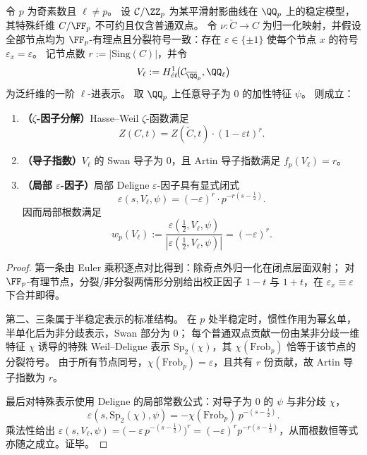 \begin{theorem}\label{thm:xi-semistable-nodal-fiber-local-epsilon-factor}
令 \(p\) 为奇素数且 \(\ell\neq p\)。
设 \(\mathcal C/\ZZ_p\) 为某平滑射影曲线在 \(\QQ_p\) 上的稳定模型，其特殊纤维 \(C/\FF_p\) 不可约且仅含普通双点。
令 \(\nu:\widetilde C\to C\) 为归一化映射，并假设全部节点均为 \(\FF_p\)-有理点且分裂符号一致：存在 \(\varepsilon\in\{\pm 1\}\) 使每个节点 \(x\) 的符号 \(\varepsilon_x=\varepsilon\)。
记节点数 \(r:=|\mathrm{Sing}(C)|\)，并令
\[
V_\ell:=H^1_{\acute e t}\!\bigl(\mathcal C_{\overline{\QQ}_p},\QQ_\ell\bigr)
\]
为泛纤维的一阶 \(\ell\)-进表示。
取 \(\QQ_p\) 上任意导子为 \(0\) 的加性特征 \(\psi\)。
则成立：
\begin{enumerate}
  \item \textbf{（\texorpdfstring{$\zeta$}{zeta}-因子分解）}Hasse--Weil \(\zeta\)-函数满足
  \[
  Z(C,t)=Z(\widetilde C,t)\cdot(1-\varepsilon t)^{r}.
  \]
  \item \textbf{（导子指数）}\(V_\ell\) 的 Swan 导子为 \(0\)，且 Artin 导子指数满足 \(f_p(V_\ell)=r\)。
  \item \textbf{（局部 \texorpdfstring{$\varepsilon$}{epsilon}-因子）}局部 Deligne \(\varepsilon\)-因子具有显式闭式
  \[
  \varepsilon\!\left(s,V_\ell,\psi\right)=(-\varepsilon)^{r}\cdot p^{-r\left(s-\tfrac12\right)}.
  \]
  因而局部根数满足
  \[
  w_p(V_\ell):=\frac{\varepsilon(\tfrac12,V_\ell,\psi)}{\left|\varepsilon(\tfrac12,V_\ell,\psi)\right|}
  =(-\varepsilon)^{r}.
  \]
\end{enumerate}
\end{theorem}
\begin{proof}
第一条由 Euler 乘积逐点对比得到：除奇点外归一化在闭点层面双射；
对 \(\FF_p\)-有理节点，分裂/非分裂两情形分别给出校正因子 \(1-t\) 与 \(1+t\)，在 \(\varepsilon_x\equiv\varepsilon\) 下合并即得。
\par
第二、三条属于半稳定表示的标准结构。
在 \(p\) 处半稳定时，惯性作用为幂幺单，半单化后为非分歧表示，Swan 部分为 \(0\)；
每个普通双点贡献一份由某非分歧一维特征 \(\chi\) 诱导的特殊 Weil--Deligne 表示 \(\mathrm{Sp}_2(\chi)\)，其 \(\chi(\mathrm{Frob}_p)\) 恰等于该节点的分裂符号。
由于所有节点同号，\(\chi(\mathrm{Frob}_p)=\varepsilon\)，且共有 \(r\) 份贡献，故 Artin 导子指数为 \(r\)。
\par
最后对特殊表示使用 Deligne 的局部常数公式：对导子为 \(0\) 的 \(\psi\) 与非分歧 \(\chi\)，
\[
\varepsilon\!\left(s,\mathrm{Sp}_2(\chi),\psi\right)=-\chi(\mathrm{Frob}_p)\,p^{-(s-\tfrac12)}.
\]
乘法性给出
\(
\varepsilon(s,V_\ell,\psi)=\bigl(-\varepsilon\,p^{-(s-\tfrac12)}\bigr)^{r}
=(-\varepsilon)^r p^{-r(s-\tfrac12)}
\)，从而根数恒等式亦随之成立。证毕。
\end{proof}

